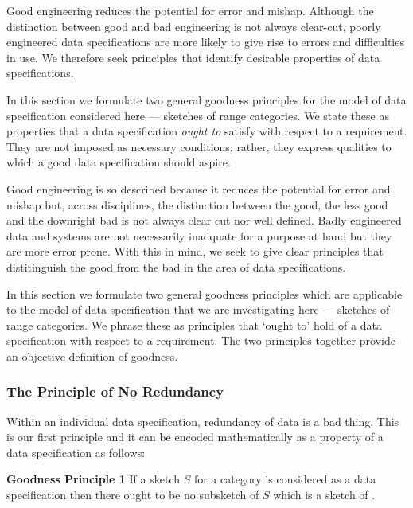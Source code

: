 
\begin{newtt} %
Good engineering reduces the potential for error and mishap. Although the
distinction between good and bad engineering is not always clear-cut,
poorly engineered data specifications are more likely to give rise to
errors and difficulties in use. We therefore seek principles that
identify desirable properties of data specifications.

In this section we formulate two general goodness principles for the
model of data specification considered here --- sketches of range
categories. We state these as properties that a data specification
\emph{ought to} satisfy with respect to a requirement. They are not
imposed as necessary conditions; rather, they express qualities to which
a good data specification should aspire.
\end{newtt}

\begin{oldtt} %
Good engineering is so described because it reduces the potential for error and mishap but, across disciplines, the distinction between the  good, the less good and the downright  bad is not always clear cut nor well defined.
Badly engineered data and systems are not necessarily inadquate for a purpose at hand but they are more error prone. With this in mind, we seek to give clear principles that distitinguish the good from the bad in the area of  data specifications.

In this section we formulate two general goodness principles which are applicable to  the model of data specification that we are investigating here
 --- sketches of range categories. 
We phrase these as principles that `ought to' hold of a data specification with respect to a requirement. 
The two principles together provide an objective definition  of goodness. 
\end{oldtt}

\subsubsection{The Principle of No Redundancy}
Within an individual data specification, redundancy of data is a bad thing. This is our first principle and it can be encoded mathematically as a property of a data specification as follows:

\textbf{Goodness Principle 1} If a sketch $S$ for a category \catcw 
is considered as a data specification then  there ought to be no subsketch of $S$ which is a sketch of \catcw. 

